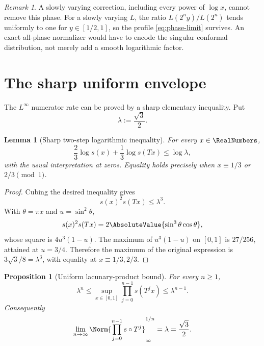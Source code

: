 \documentclass[11pt,oneside]{article}
\newtheorem{proposition}[theorem]{Proposition}
\newtheorem{lemma}[theorem]{Lemma}
\theoremstyle{definition}
\theoremstyle{remark}
\newtheorem{remark}[theorem]{Remark}
\begin{document}
\begin{remark}
A slowly varying correction, including every power of $\log x$, cannot remove this phase.
For a slowly varying $L$, the ratio $L(2^ny)/L(2^n)$ tends uniformly to one for
$y\in[1/2,1]$, so the profile \eqref{eq:phase-limit} survives.  An exact all-phase
normalizer would have to encode the singular conformal distribution, not merely add a
smooth logarithmic factor.
\end{remark}

\section{The sharp uniform envelope}
\label{sec:uniform}

The $L^\infty$ numerator rate can be proved by a sharp elementary inequality.  Put
\begin{equation}
 \lambda:=\frac{\sqrt3}{2}.
 \label{eq:lambda}
\end{equation}

\begin{lemma}[Sharp two-step logarithmic inequality]
\label{lem:sharp-sine-inequality}
For every $x\in\RealNumbers$,
\begin{equation}
 \frac23\log s(x)+\frac13\log s(Tx)\le\log\lambda,
 \label{eq:weighted-log-inequality}
\end{equation}
with the usual interpretation at zeros.  Equality holds precisely when
$x\equiv1/3$ or $2/3\pmod1$.
\end{lemma}

\begin{proof}
Cubing the desired inequality gives
\[
 s(x)^2s(Tx)\le\lambda^3.
\]
With $\theta=\pi x$ and $u=\sin^2\theta$,
\[
 s(x)^2s(Tx)=2\AbsoluteValue{\sin^3\theta\cos\theta},
\]
whose square is $4u^3(1-u)$.  The maximum of $u^3(1-u)$ on $[0,1]$ is $27/256$, attained
at $u=3/4$.  Therefore the maximum of the original expression is
$3\sqrt3/8=\lambda^3$, with equality at $x\equiv1/3,2/3$.
\end{proof}

\begin{proposition}[Uniform lacunary-product bound]
\label{prop:Bn-uniform}
For every $n\ge1$,
\begin{equation}
 \lambda^n\le\sup_{x\in[0,1]}
 \prod_{j=0}^{n-1}s(T^jx)\le\lambda^{n-1}.
 \label{eq:Bn-uniform}
\end{equation}
Consequently
\begin{equation}
 \lim_{n\to\infty}\Norm{\prod_{j=0}^{n-1}s\circ T^j}_{\infty}^{1/n}
 =\lambda=\frac{\sqrt3}{2}.
 \label{eq:Gelfond-rate}
\end{equation}
\end{proposition}
\end{document}
